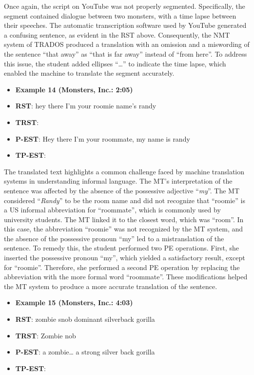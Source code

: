 \documentclass[english]{textolivre}
\begin{document}
Once again, the script on YouTube was not properly segmented. Specifically, the segment contained dialogue between two monsters, with a time lapse between their speeches. The automatic transcription software used by YouTube generated a confusing sentence, as evident in the RST above. Consequently, the NMT system of TRADOS produced a translation with an omission and a miswording of the sentence “that away” as “that is far away” instead of “from here”. To address this issue, the student added ellipses “…” to indicate the time lapse, which enabled the machine to translate the segment accurately.

\begin{itemize}
    \item \textbf{Example 14 (Monsters, Inc.: 2:05)}
\item \textbf{RST}: hey there I’m your roomie name’s randy
\item \textbf{TRST}: 
\item \textbf{P-EST}: Hey there I’m your roommate, my name is randy
\item \textbf{TP-EST}: 
\end{itemize}

The translated text highlights a common challenge faced by machine translation systems in understanding informal language. The MT's interpretation of the sentence was affected by the absence of the possessive adjective “\emph{my}”. The MT considered “\emph{Randy}” to be the room name and did not recognize that “roomie” is a US informal abbreviation for “roommate”, which is commonly used by university students. The MT linked it to the closest word, which was “room”. In this case, the abbreviation “roomie” was not recognized by the MT system, and the absence of the possessive pronoun “my” led to a mistranslation of the sentence. To remedy this, the student performed two PE operations. First, she inserted the possessive pronoun “my”, which yielded a satisfactory result, except for “roomie”. Therefore, she performed a second PE operation by replacing the abbreviation with the more formal word “roommate”. These modifications helped the MT system to produce a more accurate translation of the sentence.

\begin{itemize}
\item \textbf{Example 15 (Monsters, Inc.: 4:03)}
\item \textbf{RST}: zombie snob dominant silverback gorilla
\item \textbf{TRST}: Zombie nob 
\item \textbf{P-EST}: a zombie… a strong silver back gorilla
\item \textbf{TP-EST}: 
\end{itemize}
\end{document}
